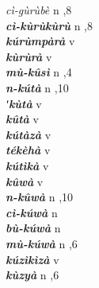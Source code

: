 \begin{multicols}{2}
{{\itshape cì-gùrùbè}} \relax  n  ,8  \relax   \relax  \\
{{\bfseries\itshape cì-kùrùkùrù}} \relax  n  ,8  \relax   \relax  \\
{{\bfseries\itshape kúrùmpàrà}} \relax  v  \relax   \relax  {} \relax   \relax  \\
{{\bfseries\itshape kùrùrà}} \relax  v  \relax   \relax  {} \relax   \relax  \\
{{\bfseries\itshape mù-kûsì}} \relax  n   ,4  \relax   \relax  \\
{{\bfseries\itshape n-kútà}} \relax  n  ,10  \relax   \relax  \\
{{\bfseries\itshape ʹkùtà}} \relax  v  \relax   \relax  {} \relax   \relax  \\
{{\bfseries\itshape kûtà}} \relax  v  \relax   \relax  {} \relax   \relax  \\
{{\bfseries\itshape kútàzà}} \relax  v  \relax   \relax  {} \relax   \relax  \\
{{\bfseries\itshape tékèhà}} \relax  v  \relax   \relax  {} \relax   \relax  \\
{{\bfseries\itshape kútìkà}} \relax  v  \relax   \relax  {} \relax   \relax  \\
{{\bfseries\itshape kûwà}} \relax  v  \relax   \relax  {} \relax   \relax  \\
{{\bfseries\itshape n-kûwà}} \relax  n  ,10  \relax   \relax  \\
{{\bfseries\itshape cì-kúwà}} \relax  n   \relax  {} \relax   \relax  \\
{{\bfseries\itshape bù-kúwà}} \relax  n   \relax  {} \relax   \relax  \\
{{\bfseries\itshape mù-kúwà}} \relax  n  ,6  \relax   \relax  \\
{{\bfseries\itshape kúzìkìzà}} \relax  v  \relax   \relax  {} \relax   \relax  \\
{{\bfseries\itshape kùzyà}} \relax  n  ,6  \relax   \relax  \\

\end{multicols}
